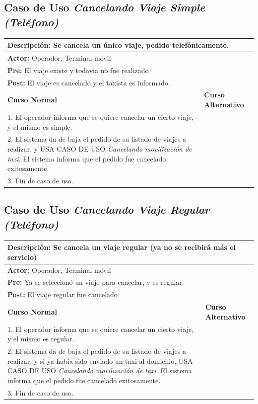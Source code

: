 \documentclass[a4paper]{article}
\begin{document}
\subsection{Caso de Uso \textit{Cancelando Viaje Simple (Tel\'efono)}}
\begin{center}
\begin{tabular}{|p{10cm} | p{6cm}|}
\hline
\multicolumn{2}{|p{16cm}|}{\textbf{Descripci\'on:} Se cancela un \'unico viaje, pedido telef\'onicamente. } \\
\hline
\multicolumn{2}{|l|}{\textbf{Actor:} Operador, Terminal m\'ovil} \\
\hline
\multicolumn{2}{|l|}{\textbf{Pre:} El viaje existe y todavia no fue realizado} \\
\hline
\multicolumn{2}{|p{16cm}|}{\textbf{Post:} El viaje es cancelado y el taxista es informado.}\\
\hline
\textbf{Curso Normal}  & \textbf{Curso Alternativo} \\ \hline
1. El operador informa que se quiere cancelar un cierto viaje, y el mismo es simple. & \\ \hline
2. El sistema da de baja el pedido de su listado de viajes a realizar, y USA CASO DE USO \textit{Cancelando movilizaci\'on de taxi}. El sistema informa que el pedido fue cancelado exitosamente. & \\ \hline
3. Fin de caso de uso. & \\ \hline
\end{tabular}
\end{center}

\subsection{Caso de Uso \textit{Cancelando Viaje Regular (Tel\'efono)}}
\begin{center}
\begin{tabular}{|p{10cm} | p{6cm}|}
\hline
\multicolumn{2}{|p{16cm}|}{\textbf{Descripci\'on:} Se cancela un viaje regular (ya no se recibir\'a m\'as el servicio) } \\
\hline
\multicolumn{2}{|l|}{\textbf{Actor:} Operador, Terminal m\'ovil} \\
\hline
\multicolumn{2}{|l|}{\textbf{Pre:} Ya se seleccion\'o un viaje para cancelar, y es regular. } \\
\hline
\multicolumn{2}{|p{16cm}|}{\textbf{Post:} El viaje regular fue cancelado}\\
\hline
\textbf{Curso Normal}  & \textbf{Curso Alternativo} \\ \hline
1. El operador informa que se quiere cancelar un cierto viaje, y el mismo es regular. & \\ \hline
2. El sistema da de baja el pedido de su listado de viajes a realizar, y si ya hab\'ia sido enviado un taxi al domicilio, USA CASO DE USO \textit{Cancelando movilizaci\'on de taxi}. El sistema informa que el pedido fue cancelado exitosamente. & \\ \hline
3. Fin de caso de uso. & \\ \hline
\end{tabular}
\end{center}
\end{document}
